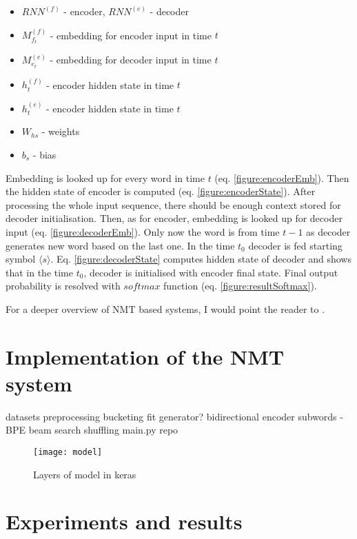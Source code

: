 \documentclass{ExcelAtFIT}
\begin{document}
\begin{itemize}
    \item $RNN^(f)$ - encoder, $RNN^(e)$ - decoder
    \item $M^{(f)}_{f_t}$ - embedding for encoder input in time $t$
    \item $M^{(e)}_{e_t}$ - embedding for decoder input in time $t$
    \item $h^{(f)}_t$ - encoder hidden state in time $t$
    \item $h^{(e)}_t$ - encoder hidden state in time $t$
    \item $W_{hs}$ - weights
    \item $b_s$ - bias
\end{itemize}


Embedding is looked up for every word in time $t$ (eq. \ref{figure:encoderEmb}). Then the hidden state of encoder is computed (eq. \ref{figure:encoderState}). After processing the whole input sequence, there should be enough context stored for decoder initialisation. Then, as for encoder, embedding is looked up for decoder input (eq. \ref{figure:decoderEmb}). Only now the word is from time $t - 1$ as decoder generates new word based on the last one. In the time $t_0$ decoder is fed starting symbol $\langle s \rangle$. Eq. \ref{figure:decoderState} computes hidden state of decoder and shows that in the time $t_0$, decoder is initialised with encoder final state. Final output probability is resolved with $softmax$ function (eq. \ref{figure:resultSoftmax}).

For a deeper overview of NMT based systems, I would point the reader to \cite{nmtTutorial}.

\section{Implementation of the NMT system}


datasets
preprocessing
bucketing
fit generator?
bidirectional encoder
subwords - BPE
beam search
shuffling
main.py repo


\begin{figure*}[h!]\centering
  \centering
  \texttt{[image: model]}
  \caption{Layers of model in keras}
  \label{fig:model}
\end{figure*}

\section{Experiments and results}
\end{document}
